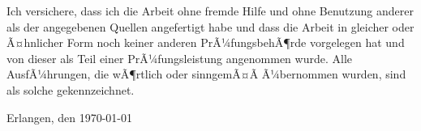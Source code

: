 
\cleardoublepage
\thispagestyle{empty}

Ich versichere, dass ich die Arbeit ohne fremde Hilfe und ohne Benutzung anderer als der angegebenen Quellen angefertigt
habe und dass die Arbeit in gleicher oder Ã¤hnlicher Form noch keiner anderen PrÃ¼fungsbehÃ¶rde vorgelegen hat und von
dieser als Teil einer PrÃ¼fungsleistung angenommen wurde. Alle AusfÃ¼hrungen, die wÃ¶rtlich oder sinngemÃ¤Ã Ã¼bernommen
wurden, sind als solche gekennzeichnet.

\vspace*{2cm}

Erlangen, den \today
\hspace{1.3cm}

\balanguage
